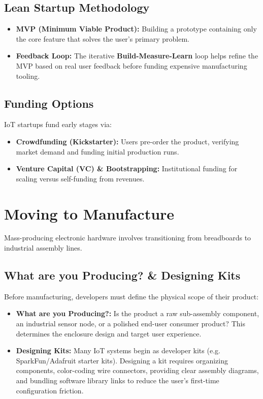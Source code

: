 \documentclass[12pt,a4paper]{article}
\begin{document}
\subsection{Lean Startup Methodology}
\begin{itemize}[leftmargin=*, itemsep=3pt]
  \item \textbf{MVP (Minimum Viable Product):} Building a prototype containing only the core feature that solves the user's primary problem.
  \item \textbf{Feedback Loop:} The iterative \textbf{Build-Measure-Learn} loop helps refine the MVP based on real user feedback before funding expensive manufacturing tooling.
\end{itemize}

\subsection{Funding Options}
IoT startups fund early stages via:
\begin{itemize}[leftmargin=*, itemsep=2pt]
  \item \textbf{Crowdfunding (Kickstarter):} Users pre-order the product, verifying market demand and funding initial production runs.
  \item \textbf{Venture Capital (VC) \& Bootstrapping:} Institutional funding for scaling versus self-funding from revenues.
\end{itemize}

\section{Moving to Manufacture}

Mass-producing electronic hardware involves transitioning from breadboards to industrial assembly lines.

\subsection{What are you Producing? \& Designing Kits}
Before manufacturing, developers must define the physical scope of their product:
\begin{itemize}[leftmargin=*, itemsep=3.0pt]
  \item \textbf{What are you Producing?:} Is the product a raw sub-assembly component, an industrial sensor node, or a polished end-user consumer product? This determines the enclosure design and target user experience.
  \item \textbf{Designing Kits:} Many IoT systems begin as developer kits (e.g. SparkFun/Adafruit starter kits). Designing a kit requires organizing components, color-coding wire connectors, providing clear assembly diagrams, and bundling software library links to reduce the user's first-time configuration friction.
\end{itemize}
\end{document}
